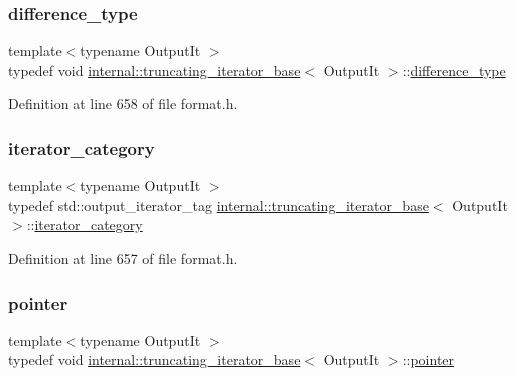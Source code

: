 \subsubsection{\texorpdfstring{difference\+\_\+type}{difference\_type}}
{\footnotesize\ttfamily template$<$typename Output\+It $>$ \\
typedef void \hyperlink{classinternal_1_1truncating__iterator__base}{internal\+::truncating\+\_\+iterator\+\_\+base}$<$ Output\+It $>$\+::\hyperlink{classinternal_1_1truncating__iterator__base_a1de427247bb2d6ff61298ce48f5fec8d}{difference\+\_\+type}}



Definition at line 658 of file format.\+h.

\mbox{\label{classinternal_1_1truncating__iterator__base_afd8b0b0e6b6731cabb88b973663996da}} 
\subsubsection{\texorpdfstring{iterator\+\_\+category}{iterator\_category}}
{\footnotesize\ttfamily template$<$typename Output\+It $>$ \\
typedef std\+::output\+\_\+iterator\+\_\+tag \hyperlink{classinternal_1_1truncating__iterator__base}{internal\+::truncating\+\_\+iterator\+\_\+base}$<$ Output\+It $>$\+::\hyperlink{classinternal_1_1truncating__iterator__base_afd8b0b0e6b6731cabb88b973663996da}{iterator\+\_\+category}}



Definition at line 657 of file format.\+h.

\mbox{\label{classinternal_1_1truncating__iterator__base_ab92c92d6ee81f9d2ebe602f3f30221db}} 
\subsubsection{\texorpdfstring{pointer}{pointer}}
{\footnotesize\ttfamily template$<$typename Output\+It $>$ \\
typedef void \hyperlink{classinternal_1_1truncating__iterator__base}{internal\+::truncating\+\_\+iterator\+\_\+base}$<$ Output\+It $>$\+::\hyperlink{classinternal_1_1truncating__iterator__base_ab92c92d6ee81f9d2ebe602f3f30221db}{pointer}}



